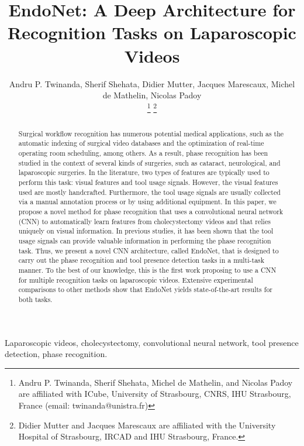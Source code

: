 \documentclass[journal]{IEEEtran} \usepackage{amssymb}
\begin{document}
\title{EndoNet: A Deep Architecture for Recognition Tasks on Laparoscopic Videos}

\author{Andru P. Twinanda, Sherif Shehata, Didier Mutter, Jacques Marescaux, Michel de Mathelin,  Nicolas Padoy

\thanks{Andru P. Twinanda, Sherif Shehata, Michel de Mathelin, and Nicolas Padoy are affiliated with ICube, University of Strasbourg, CNRS, IHU Strasbourg, France (email: twinanda@unistra.fr)}
\thanks{Didier Mutter and Jacques Marescaux are affiliated with the University Hospital of Strasbourg, IRCAD and IHU Strasbourg, France.}
}


\maketitle

\begin{abstract}

Surgical workflow recognition has numerous potential medical applications, such as the automatic indexing of surgical video databases and the optimization of real-time operating room scheduling, among others. As a result, phase recognition has been studied in the context of several kinds of surgeries, such as cataract, neurological, and laparoscopic surgeries. In the literature, two types of features are typically used to perform this task: visual features and tool usage signals. However, the visual features used are mostly
handcrafted. Furthermore, the tool usage signals are usually collected via a manual annotation process or by using additional equipment.
In this paper, we propose a novel method for phase recognition that uses a convolutional neural network (CNN) to automatically learn features from cholecystectomy videos and that relies uniquely on visual information.  
In previous studies, it has been shown that the tool usage signals can
provide valuable information in performing the phase recognition task. 
Thus, we present a novel CNN architecture, called EndoNet, that
is designed to carry out the phase recognition and tool presence detection
tasks in a multi-task manner. 
To the best of our knowledge, this is the first work proposing to use a CNN for multiple recognition tasks on laparoscopic
videos. Extensive experimental comparisons to other methods show that  EndoNet yields state-of-the-art results for both tasks. 
 

\end{abstract}
\begin{IEEEkeywords}
Laparoscopic videos, cholecystectomy, convolutional neural network, tool presence
detection, phase recognition.
\end{IEEEkeywords}
\end{document}
